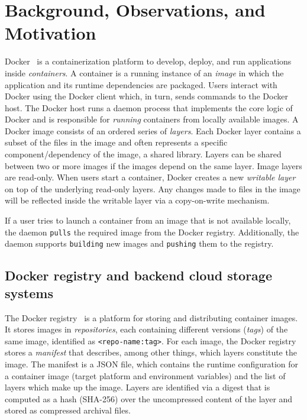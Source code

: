 \section{Background, Observations, and Motivation}
\label{sec:background}

Docker~\cite{docker} is a containerization platform to develop, deploy, and run applications inside \emph{containers}.
A container is a running instance of an \emph{image} in which the application and its runtime dependencies are packaged.
Users interact with Docker using the Docker client which, in turn, sends commands to the Docker host.
The Docker host runs a daemon process that implements the core logic of Docker and is responsible for \emph{running} containers from locally available images.
A Docker image consists of an ordered series of \emph{layers}.
Each Docker layer contains a subset of the files in the image and often represents a specific component/dependency of the image, \eg a shared library.
Layers can be shared between two or more images if the images depend on the same layer.
Image layers are read-only.
When users start a container, Docker creates a new \emph{writable layer} on top of the underlying read-only layers.
Any changes made to files in the image will be reflected inside the writable layer via a copy-on-write mechanism.

If a user tries to launch a container from an image that is not available locally, the daemon \texttt{pulls} the required image from the Docker registry.
Additionally, the daemon supports \texttt{building} new images and \texttt{pushing} them to the registry.

\subsection{Docker registry and backend cloud storage systems}
The Docker registry~\cite{docker-hub} is a platform for storing and distributing container images.
It stores images in \emph{repositories}, each containing different versions (\emph{tags}) of the same image, identified as \texttt{<repo-name:tag>}.
For each image, the Docker registry stores a \emph{manifest} that describes, among other things, which layers constitute the image.
The manifest is a JSON file, which contains the runtime configuration for a container image (\eg target platform and environment variables) 
and the list of layers which make up the image.
Layers are identified via a digest that is computed as a hash (SHA-256) over the uncompressed content of the layer and stored as compressed archival files.

